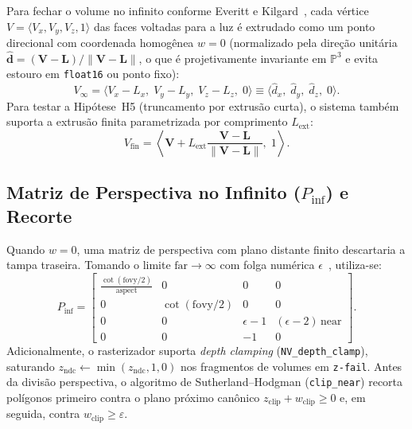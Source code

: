 \documentclass[conference]{IEEEtran}
\begin{document}
Para fechar o volume no infinito conforme Everitt e Kilgard~\cite{everitt2002}, cada vértice $V = \langle V_x, V_y, V_z, 1 \rangle$ das faces voltadas para a luz é extrudado como um ponto direcional com coordenada homogênea $w=0$ (normalizado pela direção unitária $\hat{\mathbf{d}} = (\mathbf{V} - \mathbf{L})/\|\mathbf{V} - \mathbf{L}\|$, o que é projetivamente invariante em $\mathbb{P}^3$ e evita estouro em \texttt{float16} ou ponto fixo):
\begin{equation}
V_\infty = \langle V_x - L_x,\; V_y - L_y,\; V_z - L_z,\; 0 \rangle \equiv \langle \hat{d}_x,\; \hat{d}_y,\; \hat{d}_z,\; 0 \rangle.
\end{equation}
Para testar a Hipótese~H5 (truncamento por extrusão curta), o sistema também suporta a extrusão finita parametrizada por comprimento $L_{\text{ext}}$:
\begin{equation}
V_{\text{fin}} = \left\langle \mathbf{V} + L_{\text{ext}} \frac{\mathbf{V} - \mathbf{L}}{\|\mathbf{V} - \mathbf{L}\|},\; 1 \right\rangle.
\end{equation}

\subsection{Matriz de Perspectiva no Infinito ($P_{\text{inf}}$) e Recorte}

Quando $w=0$, uma matriz de perspectiva com plano distante finito descartaria a tampa traseira. Tomando o limite $\text{far} \to \infty$ com folga numérica $\epsilon$~\cite{everitt2002,blinn1993}, utiliza-se:
\begin{equation}
P_{\text{inf}} =
\begin{bmatrix}
\frac{\cot(\text{fovy}/2)}{\text{aspect}} & 0 & 0 & 0 \\
0 & \cot(\text{fovy}/2) & 0 & 0 \\
0 & 0 & \epsilon - 1 & (\epsilon - 2)\,\text{near} \\
0 & 0 & -1 & 0
\end{bmatrix}.
\end{equation}
Adicionalmente, o rasterizador suporta \textit{depth clamping} (\texttt{NV\_depth\_clamp}), saturando $z_{\text{ndc}} \leftarrow \min(z_{\text{ndc}}, 1{,}0)$ nos fragmentos de volumes em \texttt{z-fail}. Antes da divisão perspectiva, o algoritmo de Sutherland--Hodgman (\texttt{clip\_near}) recorta polígonos primeiro contra o plano próximo canônico $z_{\text{clip}} + w_{\text{clip}} \ge 0$ e, em seguida, contra $w_{\text{clip}} \ge \varepsilon$.
\end{document}
